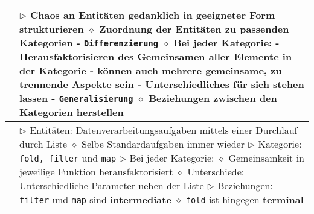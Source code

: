 	\begin{longtable}{ | p{} p{} | } 
	\hline 
	
	\makecell[l]{Abstraktion} & \makecell[l]{
	$\rhd$ Chaos an Entitäten gedanklich in geeigneter Form strukturieren \\
	\hspace{0.4cm} $\diamond$ Zuordnung der Entitäten zu passenden Kategorien \\
	\hspace{0.6cm} - \texttt{Differenzierung} \\
	\hspace{0.4cm} $\diamond$ Bei jeder Kategorie: \\
	\hspace{0.6cm} - Herausfaktorisieren des Gemeinsamen aller Elemente in der Kategorie \\
	\hspace{0.6cm} - können auch mehrere gemeinsame, zu trennende Aspekte sein \\
	\hspace{0.6cm} - Unterschiedliches für sich stehen lassen \\
	\hspace{0.6cm} - \texttt{Generalisierung} \\
	\hspace{0.4cm} $\diamond$ Beziehungen zwischen den Kategorien herstellen} \\ \hline  
	
	\makecell[l]{Beispiel Racket} & \makecell[l]{
	$\rhd$ Entitäten: Datenverarbeitungsaufgaben mittels einer Durchlauf durch Liste \\
	\hspace{0.4cm} $\diamond$ Selbe Standardaufgaben immer wieder \\
	$\rhd$ Kategorie: \texttt{fold, filter} und \texttt{map} \\
	$\rhd$ Bei jeder Kategorie: \\
	\hspace{0.4cm} $\diamond$ Gemeinsamkeit in jeweilige Funktion herausfaktorisiert \\
	\hspace{0.4cm} $\diamond$ Unterschiede: Unterschiedliche Parameter neben der Liste \\
	$\rhd$ Beziehungen: \texttt{filter} und \texttt{map} sind \textbf{intermediate} \\
	\hspace{0.4cm} $\diamond$ \texttt{fold} ist hingegen \textbf{terminal}} \\ \hline


\end{longtable}
